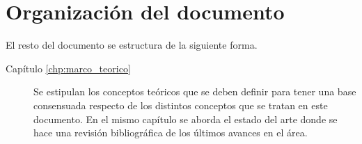 \section{Organización del documento}
\label{sec:organizacion}
El resto del documento se estructura de la siguiente forma.

\begin{description}
	\item [Capítulo \ref{chp:marco_teorico}] Se estipulan los conceptos teóricos que se deben definir para tener una base consensuada respecto de los distintos conceptos que se tratan en este documento. En el mismo capítulo se aborda el estado del arte donde se hace una revisión bibliográfica de los últimos avances en el área.
	
\end{description}